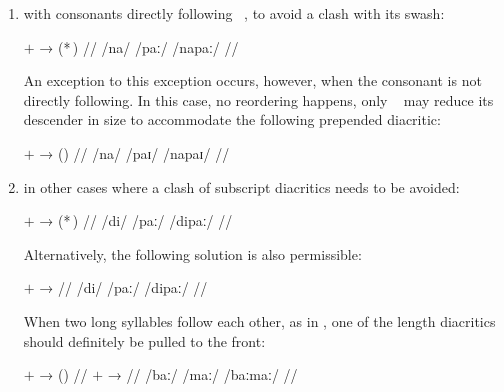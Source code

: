 \begin{enumerate}
\item with consonants directly following ~, to avoid a clash 
	with its swash:
	
	\ex[lingstyle=thex,everyglb=\itshape,numoffset=\leftmargin]
	\begingl
		\gla {} $+$  →  \quad
			(*\,) //
		\glb /na/ {} /paː/ {} /napaː/ {} {} //
	\endgl\xe
	
	An exception to this exception occurs, however, when the consonant is 
	not directly following. In this case, no reordering happens, only 
	~ may reduce its descender in size to accommodate the 
	following prepended diacritic:
	
	\pex[lingstyle=thex,everyglb=\itshape,numoffset=\leftmargin]
	\begingl
		\gla {} $+$  →  \quad
			(\ques{}) //
		\glb /na/ {} /paɪ/ {} /napaɪ/ {} {} //
	\endgl\xe
	
\item in other cases where a clash of subscript diacritics needs to be avoided:

	\ex[lingstyle=thex,everyglb=\itshape,numoffset=\leftmargin]
	\begingl
		\gla {} $+$  →  \quad 
			(*\,) //
		\glb /di/ {} /paː/ {} /dipaː/ {} {} //
	\endgl\xe
	
	Alternatively, the following solution is also permissible:
	
	\ex[lingstyle=thex,everyglb=\itshape,numoffset=\leftmargin]%
	\begingl
		\gla {} $+$  → 
		 //
		\glb /di/ {} /paː/ {} /dipaː/ //
	\endgl\xe
	
	When two long syllables follow each other, as in 
	, one of the length diacritics should 
	definitely be pulled to the front:
	
	\ex[lingstyle=thex,everyglb=\upshape\Large,
	everyglc=\itshape,aboveglcskip=0.5em,numoffset=\leftmargin]
	\begingl
		\gla {}  $+$  →  \quad 
			(\ques{}) //
		  $+$  → 
			 //
		\glc {} /baː/ {} /maː/ {} /baːmaː/ //
	\endgl
	
	\xe

\end{enumerate}

